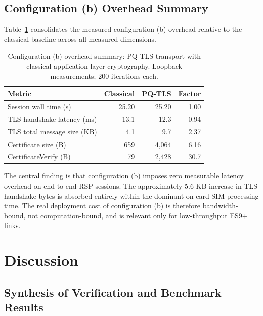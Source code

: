 \documentclass[a4paper,fleqn]{cas-sc}
\begin{document}
\subsection{Configuration (b) Overhead Summary}
\label{sec:bench-summary}

Table~\ref{tab:option-b-summary} consolidates the measured configuration
(b) overhead relative to the classical baseline across all measured
dimensions.

\begin{table}[!htb]
\caption{Configuration (b) overhead summary: PQ-TLS transport with
  classical application-layer cryptography. Loopback measurements;
  200 iterations each.}
\label{tab:option-b-summary}
\centering
\footnotesize
\setlength{\tabcolsep}{4pt}
\renewcommand{\arraystretch}{1.1}
\begin{tabular}{@{}lrrr@{}}
\toprule
\textbf{Metric} & \textbf{Classical} & \textbf{PQ-TLS} & \textbf{Factor} \\
\midrule
Session wall time (s)        & 25.20 & 25.20 & 1.00 \\
TLS handshake latency (ms)   & 13.1  & 12.3  & 0.94 \\
TLS total message size (KB)  & 4.1   & 9.7   & 2.37 \\
Certificate size (B)         & 659   & 4{,}064 & 6.16 \\
CertificateVerify (B)        & 79    & 2{,}428 & 30.7 \\
\bottomrule
\end{tabular}
\end{table}

The central finding is that configuration (b) imposes zero measurable
latency overhead on end-to-end RSP sessions. The approximately 5.6 KB
increase in TLS handshake bytes is absorbed entirely within the dominant
on-card SIM processing time. The real deployment cost of configuration (b)
is therefore bandwidth-bound, not computation-bound, and is relevant only
for low-throughput ES9+ links.

\section{Discussion}
\label{sec:discussion}

\subsection{Synthesis of Verification and Benchmark Results}
\label{sec:disc-synthesis}
\end{document}
